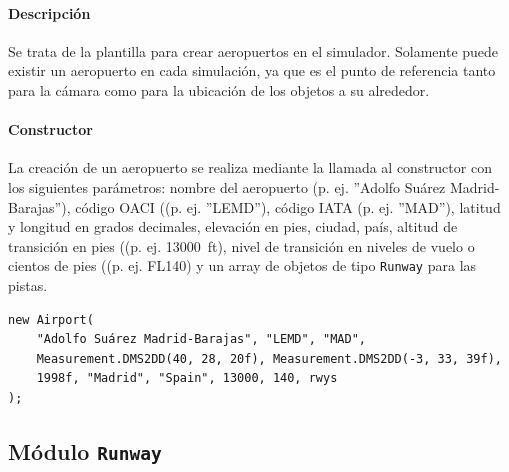 \paragraph{Descripción} \phantom{\newline}

Se trata de la plantilla para crear aeropuertos en el simulador. Solamente puede existir un aeropuerto en cada simulación, ya que es el punto de referencia tanto para la cámara como para la ubicación de los objetos a su alrededor.

\paragraph{Constructor} \phantom{\newline}

La creación de un aeropuerto se realiza mediante la llamada al constructor con los siguientes parámetros: nombre del aeropuerto (p. ej. ''Adolfo Suárez Madrid-Barajas''), código OACI ((p. ej. ''LEMD''), código IATA (p. ej. ''MAD''), latitud y longitud en grados decimales, elevación en pies, ciudad, país, altitud de transición en pies ((p. ej. \SI{13000}{ft}), nivel de transición en niveles de vuelo o cientos de pies ((p. ej. FL140) y un array de objetos de tipo \texttt{Runway} para las pistas.

\begin{table}[!hbtp]
	\caption{Ejemplo de instancia al constructor de la clase \texttt{Airport}.}
	\label{tab:EjemploAirport}
\end{table}
\vspace{-0.8cm}
\begin{scriptsize}
\begin{Verbatim}[frame=single]
new Airport(
    "Adolfo Suárez Madrid-Barajas", "LEMD", "MAD", 
    Measurement.DMS2DD(40, 28, 20f), Measurement.DMS2DD(-3, 33, 39f), 
    1998f, "Madrid", "Spain", 13000, 140, rwys
);
\end{Verbatim}
\end{scriptsize}



\clearpage

\subsection{Módulo \texttt{Runway}}
\label{subsec:ClaseRunway}

